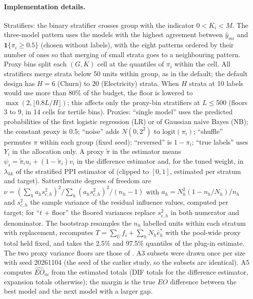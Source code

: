 \documentclass[pdflatex,sn-mathphys-num,iicol]{sn-jnl}
\theoremstyle{thmstyleone}
\theoremstyle{thmstyletwo}
\theoremstyle{thmstylethree}
\begin{document}
\paragraph{Implementation details.} Stratifiers: the binary stratifier crosses group with the indicator $0<K_i<M$. The three-model pattern uses the models with the highest agreement between $\hat y_{mi}$ and $\mathbf 1\{\pi_i\ge 0.5\}$ (chosen without labels), with the eight patterns ordered by their number of ones so that merging of small strata goes to a neighbouring pattern. Proxy bins split each $(G,K)$ cell at the quantiles of $\pi_i$ within the cell. All stratifiers merge strata below 50 units within group, as in the default; the default design has $H=6$ (Churn) to 20 (Electricity) strata. When $H$ strata at 10 labels would use more than 80\% of the budget, the floor is lowered to $\max(2,\lfloor 0.8L/H\rfloor)$; this affects only the proxy-bin stratifiers at $L\le 500$ (floors 3 to 9, in 14 cells for tertile bins). Proxies: ``single model'' uses the predicted probabilities of the first logistic regression (LR) or of Gaussian naive Bayes (NB); the constant proxy is 0.5; ``noise'' adds $N(0,2^2)$ to $\mathrm{logit}(\pi_i)$; ``shuffle'' permutes $\pi$ within each group (fixed seed); ``reversed'' is $1-\pi_i$; ``true labels'' uses $Y_i$ in the allocation only. A proxy $\tilde\pi$ in the estimator means $\psi_i=\tilde\pi_iu_i+(1-\tilde\pi_i)v_i$ in the difference estimator and, for the tuned weight, in $\lambda_{hk}$ of the stratified PPI estimator of  (clipped to $[0,1]$, estimated per stratum and target). Satterthwaite degrees of freedom are $\nu=(\sum_h a_h s^2_{e,h})^2/\sum_h (a_h s^2_{e,h})^2/(n_h-1)$ with $a_h=N_h^2(1-n_h/N_h)/n_h$ and $s^2_{e,h}$ the sample variance of the residual influence values, computed per target; for ``$t$ + floor'' the floored variances replace $s^2_{e,h}$ in both numerator and denominator. The bootstrap resamples the $n_h$ labelled units within each stratum with replacement, recomputes $T=\sum_Uf_i+\sum_hN_h\bar e^{*}_h$ with the pool-wide proxy total held fixed, and takes the 2.5\% and 97.5\% quantiles of the plug-in estimate. The two proxy variance floors are those of . A3 subsets were drawn once per size with seed 20261104 (the seed of the earlier study, so the subsets are identical). A5 computes $\widehat{EO}_m$ from the estimated totals (DIF totals for the difference estimator, expansion totals otherwise); the margin is the true $EO$ difference between the best model and the next model with a larger gap.
\end{document}
